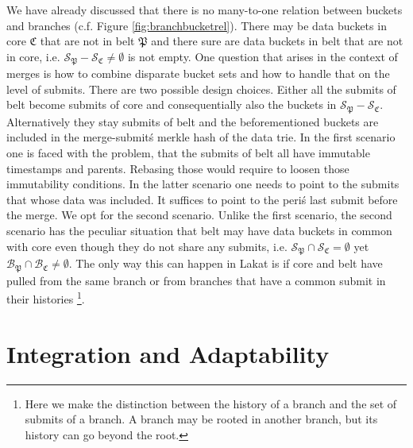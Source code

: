 \documentclass[14pt]{article}
\begin{document}
We have already discussed that there is no many-to-one relation between buckets and branches (c.f. Figure \ref{fig:branchbucketrel}). There may be data buckets in core $\mathfrak C$ that are not in belt $\mathfrak P$ and there sure are data buckets in belt that are not in core, i.e. $\mathcal S_{\mathfrak P}-\mathcal S_{\mathfrak C}\neq \emptyset$ is not empty. 
One question that arises in the context of merges is how to combine disparate bucket sets and how to handle that on the level of submits. There are two possible design choices. Either all the submits of belt become submits of core and consequentially also the buckets in $\mathcal S_{\mathfrak P}-\mathcal S_{\mathfrak C}$. Alternatively they stay submits of belt and the beforementioned buckets are included in the merge-submit\'s merkle hash of the data trie. In the first scenario one is faced with the problem, that the submits of belt all have immutable timestamps and parents. Rebasing those would require to loosen those immutability conditions. In the latter scenario one needs to point to the submits that whose data was included. It suffices to point to the peri\'s last submit before the merge. We opt for the second scenario. Unlike the first scenario, the second scenario has the peculiar situation that belt may have data buckets in common with core even though they do not share any submits, i.e. $\mathcal S_{\mathfrak P}\cap\mathcal S_{\mathfrak C}= \emptyset$ yet $\mathcal B_{\mathfrak P}\cap\mathcal B_{\mathfrak C}\neq \emptyset$. The only way this can happen in Lakat is if core and belt have pulled from the same branch or from branches that have a common submit in their histories \footnote{Here we make the distinction between the history of a branch and the set of submits of a branch. A branch may be rooted in another branch, but its history can go beyond the root.}. 

% 
% 
% 
% 
% 
% 




\section{Integration and Adaptability}
\label{sc:integrationadaptability}
\end{document}
